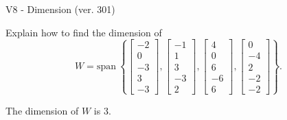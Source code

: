 \begin{exercise}
  \begin{exerciseTitle}V8 - Dimension (ver. 301)\end{exerciseTitle}
  \begin{exerciseStatement}
    Explain how to find the dimension of 
\[W=\mathrm{span}\ \left\{\left[\begin{array}{r}
-2 \\
0 \\
-3 \\
3 \\
-3
\end{array}\right] , \left[\begin{array}{r}
-1 \\
1 \\
3 \\
-3 \\
2
\end{array}\right] , \left[\begin{array}{r}
4 \\
0 \\
6 \\
-6 \\
6
\end{array}\right] , \left[\begin{array}{r}
0 \\
-4 \\
2 \\
-2 \\
-2
\end{array}\right]\right\}.\]



  \end{exerciseStatement}
  \begin{exerciseAnswer}
   The dimension of \(W\) is  \(3\).
  


  \end{exerciseAnswer}
\end{exercise}